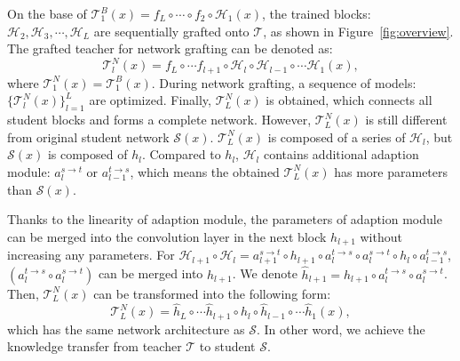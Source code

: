 \documentclass[letterpaper]{article} %
\begin{document}
{{        On the base of $\mathcal{T}_1^B(x) = f_L \circ \cdots \circ f_2 \circ \mathcal{H}_1(x)$, the trained blocks: $\mathcal{H}_2, \mathcal{H}_3, \cdots, \mathcal{H}_L$ are sequentially grafted onto $\mathcal{T}$, as shown in Figure~\ref{fig:overview}. 
        The grafted teacher for network grafting can be denoted as:
        \begin{equation} \label{eq:net_graft}
            \mathcal{T}_l^N(x) = f_L \circ \cdots f_{l+1} \circ \mathcal{H}_l \circ \mathcal{H}_{l-1} \circ \cdots \mathcal{H}_1(x),
        \end{equation}
        where $\mathcal{T}_1^N(x) = \mathcal{T}_1^B(x)$.
        During network grafting, a sequence of models: $\{\mathcal{T}_l^N(x)\}_{l=1}^L$ are optimized.
        Finally, $\mathcal{T}_L^N(x)$ is obtained, which connects all student blocks and forms a complete network.
        However, $\mathcal{T}_L^N(x)$ is still different from original student network $\mathcal{S}(x)$.
        $\mathcal{T}_L^N(x)$ is composed of a series of $\mathcal{H}_l$, but $\mathcal{S}(x)$ is composed of $h_l$.
        Compared to $h_l$, $\mathcal{H}_l$ contains additional adaption module: $a_{l}^{s \rightarrow t}$ or $a_{l-1}^{t \rightarrow s}$, which means the obtained $\mathcal{T}_L^N(x)$ has more parameters than $\mathcal{S}(x)$.

        Thanks to the linearity of adaption module, the parameters of adaption module can be merged into the convolution layer in the next block $h_{l+1}$ without increasing any parameters. 
        For $\mathcal{H}_{l+1} \circ \mathcal{H}_l = a_{l+1}^{s \rightarrow t}\circ h_{l+1} \circ a_{l}^{t \rightarrow s} \circ a_{l}^{s \rightarrow t}\circ h_l \circ a_{l-1}^{t \rightarrow s}$, $(a_{l}^{t \rightarrow s} \circ a_{l}^{s \rightarrow t})$ can be merged into $h_{l+1}$. We denote $\hat{h}_{l+1} = h_{l+1} \circ a_{l}^{t \rightarrow s} \circ a_{l}^{s \rightarrow t}$.
        Then, $\mathcal{T}_L^N(x)$ can be transformed into the following form:
        \begin{equation} \label{eq:final_net_graft}
            \mathcal{T}_L^N(x) = \hat{h}_L \circ \cdots \hat{h}_{l+1} \circ \hat{h}_l \circ \hat{h}_{l-1} \circ \cdots \hat{h}_1(x),
        \end{equation}
        which has the same network architecture as $\mathcal{S}$. 
        In other word, we achieve the knowledge transfer from teacher $\mathcal{T}$ to student $\mathcal{S}$.


    }

}
\end{document}
